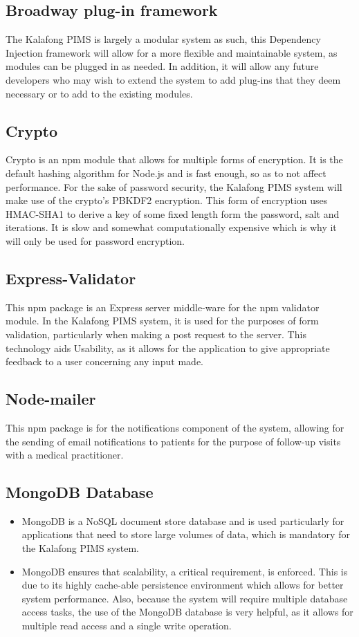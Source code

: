 \subsection{Broadway plug-in framework}
The Kalafong PIMS is largely a modular system as such, this Dependency Injection framework will allow for a more flexible and maintainable system, as modules can be plugged in as needed. In addition, it will allow any future developers who may wish to extend the system to add plug-ins that they deem necessary or to add to the existing modules.

\subsection{Crypto}
Crypto is an npm module that allows for multiple forms of encryption. It is the default hashing algorithm for Node.js and is fast enough, so as to not affect performance. For the sake of password security, the Kalafong PIMS system will make use of the crypto's PBKDF2 encryption. This form of encryption uses HMAC-SHA1 to derive a key of some fixed length form the password, salt and iterations. It is slow and somewhat computationally expensive which is why it will only be used for password encryption. 

\subsection{Express-Validator}
This npm package is an Express server middle-ware for the npm validator module. In the Kalafong PIMS system, it is used for the purposes of form validation, particularly when making a post request to the server. This technology aids Usability, as it allows for the application to give appropriate feedback to a user concerning any input made.

\subsection{Node-mailer}
This npm package is for the notifications component of the system, allowing for the sending of email notifications to patients for the purpose of follow-up visits with a medical practitioner.
	
\subsection{MongoDB Database}
\begin{itemize}
	\item MongoDB is a NoSQL document store database and is used particularly for applications that need to store large volumes of data, which is mandatory for the Kalafong PIMS system.
	\item MongoDB ensures that scalability, a critical requirement, is enforced. This is due to its highly cache-able persistence environment which allows for better system performance. Also, because the system will require multiple database access tasks, the use of the MongoDB database is very helpful, as it allows for multiple read access and a single write operation.
\end{itemize}
	
